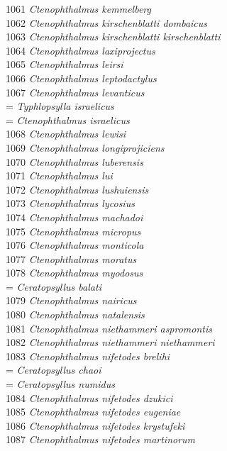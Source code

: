 \documentclass[
]{article}
\begin{document}
1061 \emph{Ctenophthalmus kemmelberg}\\
1062 \emph{Ctenophthalmus kirschenblatti dombaicus}\\
1063 \emph{Ctenophthalmus kirschenblatti kirschenblatti}\\
1064 \emph{Ctenophthalmus laxiprojectus}\\
1065 \emph{Ctenophthalmus leirsi}\\
1066 \emph{Ctenophthalmus leptodactylus}\\
1067 \emph{Ctenophthalmus levanticus}\\
= \emph{Typhlopsylla israelicus}\\
= \emph{Ctenophthalmus israelicus}\\
1068 \emph{Ctenophthalmus lewisi}\\
1069 \emph{Ctenophthalmus longiprojiciens}\\
1070 \emph{Ctenophthalmus luberensis}\\
1071 \emph{Ctenophthalmus lui}\\
1072 \emph{Ctenophthalmus lushuiensis}\\
1073 \emph{Ctenophthalmus lycosius}\\
1074 \emph{Ctenophthalmus machadoi}\\
1075 \emph{Ctenophthalmus micropus}\\
1076 \emph{Ctenophthalmus monticola}\\
1077 \emph{Ctenophthalmus moratus}\\
1078 \emph{Ctenophthalmus myodosus}\\
= \emph{Ceratopsyllus balati}\\
1079 \emph{Ctenophthalmus nairicus}\\
1080 \emph{Ctenophthalmus natalensis}\\
1081 \emph{Ctenophthalmus niethammeri aspromontis}\\
1082 \emph{Ctenophthalmus niethammeri niethammeri}\\
1083 \emph{Ctenophthalmus nifetodes brelihi}\\
= \emph{Ceratopsyllus chaoi}\\
= \emph{Ceratopsyllus numidus}\\
1084 \emph{Ctenophthalmus nifetodes dzukici}\\
1085 \emph{Ctenophthalmus nifetodes eugeniae}\\
1086 \emph{Ctenophthalmus nifetodes krystufeki}\\
1087 \emph{Ctenophthalmus nifetodes martinorum}\\
\end{document}
